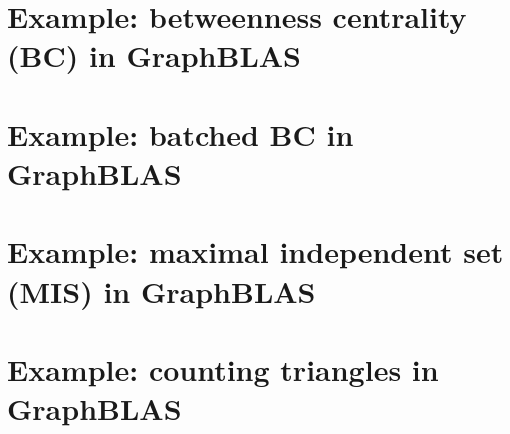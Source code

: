 \pagebreak
\nolinenumbers
\section{Example: betweenness centrality (BC) in GraphBLAS}
\label{App:BCnobatch}
{\scriptsize

}
\vfill

\pagebreak
\nolinenumbers
\section{Example: batched BC in GraphBLAS}
{\scriptsize

}
\vfill

\pagebreak
\nolinenumbers
\section{Example: maximal independent set (MIS) in GraphBLAS}
{\scriptsize

}
\vfill

\pagebreak
\nolinenumbers
\section{Example: counting triangles in GraphBLAS}
{\scriptsize

}
\vfill
\pagebreak
